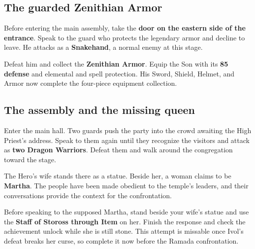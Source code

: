 
\subsection*{The guarded Zenithian Armor}

Before entering the main assembly, take the \textbf{door on
the eastern side of the entrance}. Speak to the guard who
protects the legendary armor and decline to leave. He attacks
as a \textbf{Snakehand}, a normal enemy at this stage.

Defeat him and collect the \textbf{Zenithian Armor}.
Equip the Son with its \textbf{85 defense} and elemental
and spell protection. His Sword, Shield, Helmet, and Armor
now complete the four-piece equipment collection.


\subsection*{The assembly and the missing queen}

Enter the main hall. Two guards push the party into the
crowd awaiting the High Priest's address. Speak to them again
until they recognize the visitors and attack as
\textbf{two Dragon Warriors}. Defeat them and walk around
the congregation toward the stage.

The Hero's wife stands there as a statue. Beside her, a
woman claims to be \textbf{Martha}. The people have been
made obedient to the temple's leaders, and their conversations
provide the context for the confrontation.

Before speaking to the supposed Martha, stand beside your wife's
statue and use the \textbf{Staff of Stoross through Item} on her.
Finish the response and check the achievement unlock while she is
still stone. This attempt is missable once Ivol's defeat breaks her
curse, so complete it now before the Ramada confrontation.


